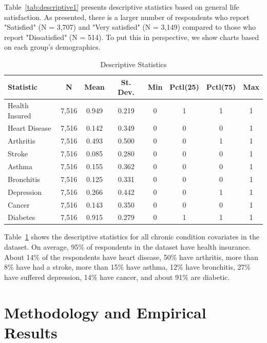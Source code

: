 \documentclass[11pt,a4paper,oldfontcommands]{memoir}
\begin{document}
{Table~\ref{tab:descriptive1} presents descriptive statistics based on general life satisfaction. As presented, there is a larger number of respondents who report "Satisfied" (N = 3,707) and "Very satisfied" (N = 3,149) compared to those who report "Dissatisfied" (N = 514). To put this in perspective, we show charts based on each group's demographics.

\begin{small}
\begin{longtable}{lccccccc}
\caption{\large Descriptive Statistics \label{tab:descriptive2}} \\ 
\toprule
Statistic & \multicolumn{1}{c}{N} & \multicolumn{1}{c}{Mean} & \multicolumn{1}{c}{St. Dev.} & \multicolumn{1}{c}{Min} & \multicolumn{1}{c}{Pctl(25)} & \multicolumn{1}{c}{Pctl(75)} & \multicolumn{1}{c}{Max} \\ 
\hline 
\midrule
Health Insured & 7,516 & 0.949 & 0.219 & 0 & 1 & 1 & 1 \\ 
Heart Disease & 7,516 & 0.142 & 0.349 & 0 & 0 & 0 & 1 \\ 
Arthritis & 7,516 & 0.493 & 0.500 & 0 & 0 & 1 & 1 \\ 
Stroke & 7,516 & 0.085 & 0.280 & 0 & 0 & 0 & 1 \\ 
Asthma & 7,516 & 0.155 & 0.362 & 0 & 0 & 0 & 1 \\ 
Bronchitis & 7,516 & 0.125 & 0.331 & 0 & 0 & 0 & 1 \\ 
Depression & 7,516 & 0.266 & 0.442 & 0 & 0 & 1 & 1 \\ 
Cancer & 7,516 & 0.143 & 0.350 & 0 & 0 & 0 & 1 \\ 
Diabetes & 7,516 & 0.915 & 0.279 & 0 & 1 & 1 & 1 \\ 
\hline 
\bottomrule
\end{longtable}
\end{small}

Table~\ref{tab:descriptive2} shows the descriptive statistics for all chronic condition covariates in the dataset. On average, 95\% of respondents in the dataset have health insurance. About 14\% of the respondents have heart disease, 50\% have arthritis, more than 8\% have had a stroke, more than 15\% have asthma, 12\% have bronchitis, 27\% have suffered depression, 14\% have cancer, and about 91\% are diabetic.


\section{Methodology and Empirical Results}

}
\end{document}
